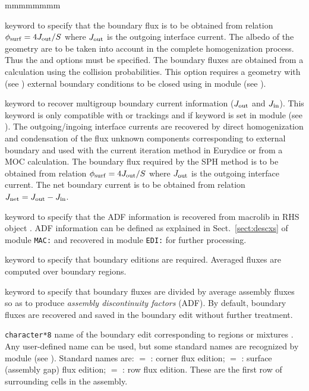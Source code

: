\begin{ListeDeDescription}{mmmmmmmm}
\item[\moc{ALBS}] keyword to specify that the boundary flux is to be obtained from relation
$\phi_{\rm surf}=4J_{\rm out}/S$ where $J_{\rm out}$ is the outgoing interface current. The albedo of
the geometry are to be taken into account in the complete homogenization process. Thus the 
and  options must be specified. The boundary fluxes are obtained from a calculation using the collision
probabilities. This option requires a geometry with  (see ) external boundary conditions to
be closed using  in module  (see ).\cite{ALSB2}

\item[\moc{JOUT}] keyword to recover multigroup boundary current information ($J_{\rm out}$ and $J_{\rm in}$). This keyword
is only compatible with  or  trackings and if keyword  is set in module 
(see ). The outgoing/ingoing interface currents are recovered by direct homogenization and condensation of the
flux unknown components corresponding to external boundary and used with the current iteration method in Eurydice or from a MOC
calculation. The boundary flux required by the SPH method is to be obtained from relation $\phi_{\rm surf}=4J_{\rm out}/S$ where
$J_{\rm out}$ is the outgoing interface current. The net boundary current is to be obtained from relation
$J_{\rm net}=J_{\rm out}-J_{\rm in}$.

\item[\moc{ADFM}] keyword to specify that the ADF information is recovered from macrolib in RHS object . ADF information can
be defined as explained in Sect.~\ref{sect:descxs} of module {\tt MAC:} and recovered in module {\tt EDI:} for further processing.

\item[\moc{ADF}] keyword to specify that boundary editions are required. Averaged fluxes are
computed over boundary regions.

\item[\moc{*}] keyword to specify that boundary fluxes are divided by average assembly fluxes so as to produce {\sl assembly discontinuity factors}
(ADF). By default, boundary fluxes are recovered and saved in the boundary edit without further treatment.

\item[\dusa{TYPE}] {\tt character*8} name of the boundary edit corresponding to
regions  or mixtures . Any user-defined name can be used, but some
standard names are recognized by module  (see ). Standard names are: $=$ :
corner flux edition; $=$ : surface (assembly gap) flux edition; $=$ :
row flux edition. These are the first row of surrounding cells in the assembly.


\end{ListeDeDescription}
